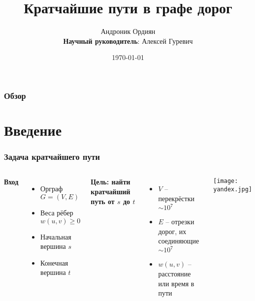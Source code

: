 \documentclass{beamer}
\title[Граф дорог]{Кратчайшие пути в графе дорог} %
\author{Андроник Ордиян\\ \textbf{Научный руководитель}: Алексей Гуревич} %
\institute[SPbAU] %
{

Академический университет  \\%

}
\date{\today} %
\begin{document}
\begin{frame}
\titlepage %
\end{frame}

\begin{frame}
\frametitle{Обзор} %
\tableofcontents %
\end{frame}


\section{Введение} %

\begin{frame}
\frametitle{Задача кратчайшего пути}
\begin{columns}[c] %

\textbf{Вход}
\begin{itemize}
\item Орграф $G = (V, E)$
\item Веса рёбер $w(u, v) \geq 0$
\item Начальная вершина $s$
\item Конечная вершина $t$
\end{itemize}

\textbf{Цель: найти кратчайший путь от $s$ до $t$}
\begin{itemize}
\item $V$ -- перекрёстки $\sim 10^7$
\item $E$ -- отрезки дорог, их соединяющие $\sim 10^7$
\item $w(u,v)$ -- расстояние или время в пути
\end{itemize}

\texttt{[image: yandex.jpg]}

\end{columns}
\end{frame}
\end{document}
